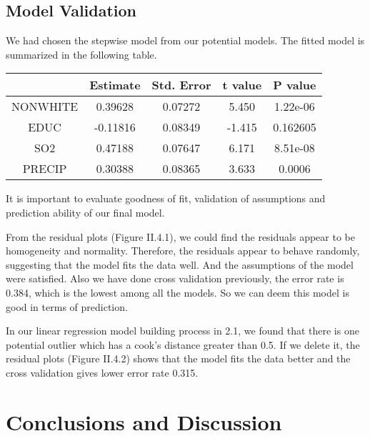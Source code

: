 \documentclass{article}
\begin{document}
  \subsection{Model Validation}

     We had chosen the stepwise model from our potential models. The fitted model is summarized in the following table.

     \begin{center}
       \begin{tabular}{c c c c c}
         \hline
         & Estimate & Std. Error & t value & P value \\
         \hline
         NONWHITE &  0.39628 & 0.07272 & 5.450 & 1.22e-06 \\
         EDUC & -0.11816 & 0.08349 & -1.415 & 0.162605 \\
         SO2 & 0.47188 & 0.07647 & 6.171 & 8.51e-08 \\
         PRECIP & 0.30388 & 0.08365 & 3.633 & 0.0006 \\
         \hline
       \end{tabular}
     \end{center}

     It is important to evaluate goodness of fit, validation of assumptions and prediction ability of our final model.

     From the residual plots (Figure II.4.1), we could find the residuals appear to be homogeneity and normality. Therefore, the residuals appear to behave randomly, suggesting that the model fits the data well. And the assumptions of the model were satisfied. Also we have done cross validation previously, the error rate is 0.384, which is the lowest among all the models. So we can deem this model is good in terms of prediction.

     In our linear regression model building process in 2.1, we found that there is one potential outlier which has a cook’s distance greater than 0.5. If we delete it, the residual plots (Figure II.4.2) shows that the model fits the data better and the cross validation gives lower error rate 0.315.

\section{Conclusions and Discussion}
\end{document}
